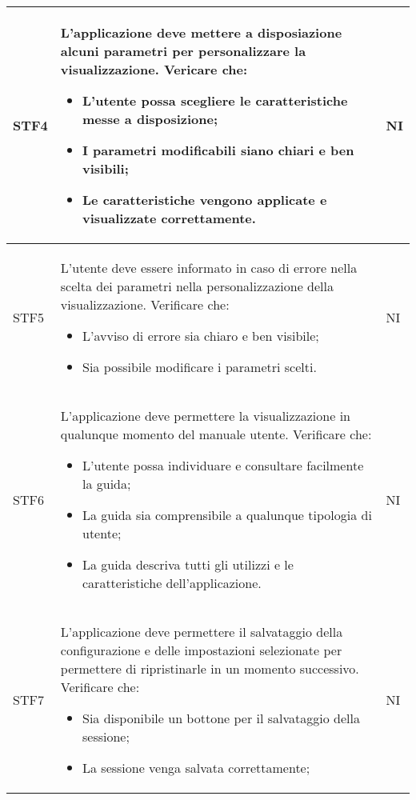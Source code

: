 \begin{longtable}{|p{1.5cm}|p{11cm}|p{1cm}|}
        STF4 & L'applicazione deve mettere a disposiazione alcuni parametri per personalizzare la visualizzazione. Vericare che: \begin{itemize}
            \item L'utente possa scegliere le caratteristiche messe a disposizione;
            \item I parametri modificabili siano chiari e ben visibili;
            \item Le caratteristiche vengono applicate e visualizzate correttamente.
        \end{itemize} & NI\\ \hline

        STF5 & L'utente deve essere informato in caso di errore nella scelta dei parametri nella personalizzazione della visualizzazione. Verificare che: \begin{itemize}
            \item L'avviso di errore sia chiaro e ben visibile;
            \item Sia possibile modificare i parametri scelti.
        \end{itemize} & NI\\ \hline

        STF6 & L'applicazione deve permettere la visualizzazione in qualunque momento del manuale utente. Verificare che: \begin{itemize}
            \item L'utente possa individuare e consultare facilmente la guida;
            \item La guida sia comprensibile a qualunque tipologia di utente;
            \item La guida descriva tutti gli utilizzi e le caratteristiche dell'applicazione.
        \end{itemize} & NI\\ \hline

        STF7 & L'applicazione deve permettere il salvataggio della configurazione e delle impostazioni selezionate per permettere di ripristinarle in un momento successivo. Verificare che: \begin{itemize}
            \item Sia disponibile un bottone per il salvataggio della sessione;
            \item La sessione venga salvata correttamente;
        \end{itemize}& NI\\ \hline
    \end{longtable}

